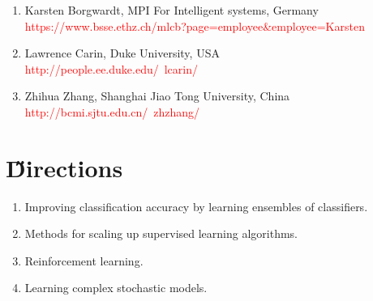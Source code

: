 \documentclass[a4paper,12pt,oneside]{book}
\newcommand{\red}[1]{  \textcolor{red}  {#1}}   %
\begin{document}
\begin{enumerate}
\item Karsten Borgwardt, MPI For Intelligent systems, Germany\\
\quad\red{https://www.bsse.ethz.ch/mlcb?page=employee\&employee=Karsten}\\

\item Lawrence Carin, Duke University, USA\\
\quad\red{http://people.ee.duke.edu/~lcarin/}\\

\item Zhihua Zhang, Shanghai Jiao Tong University, China\\
\quad\red{http://bcmi.sjtu.edu.cn/~zhzhang/}\\
\end{enumerate}




\section{\H Directions}
\begin{enumerate}
	\item Improving classification accuracy by learning ensembles of classifiers.
	\item Methods for scaling up supervised learning algorithms.
	\item Reinforcement learning.
	\item Learning complex stochastic models.
\end{enumerate}

 
\end{document}
